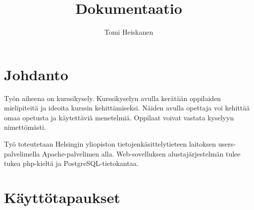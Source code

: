 \documentclass[12pt,twoside,a4paper,leqno,titlepage]{article}
\title{Dokumentaatio}
\author{Tomi Heiskanen}
\begin{document}
\maketitle

\phantom{Böö}
\thispagestyle{empty}
\newpage

\setcounter{page}{1}
\tableofcontents
\thispagestyle{empty}

\newpage
\section{Johdanto}

Työn aiheena on kurssikysely. Kurssikyselyn avulla kerätään oppilaiden 
mielipiteitä ja ideoita kurssin kehittämiseksi. Näiden avulla opettaja voi 
kehittää omaa opetusta ja käytettäviä menetelmiä. Oppilaat voivat vastata
kyselyyn nimettömästi.

Työ toteutetaan Helsingin yliopiston tietojenkäsittelytieteen laitoksen users-
palvelimella Apache-palvelimen alla. Web-sovelluksen alustajärjestelmän tulee
tukea php-kieltä ja PostgreSQL-tietokantaa.

\section{Käyttötapaukset}
\end{document}
